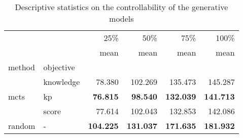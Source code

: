 \begin{table}[!h]
\centering
\caption{Descriptive statistics on the controllability of the generative models}
\label{tab:pcg_controllbility_small}
\begin{tabular}{llrrrr}
\toprule
{} & {} & {25\%} & {50\%} & {75\%} & {100\%} \\
{} & {} & {mean} & {mean} & {mean} & {mean} \\
{method} & {objective} & {} & {} & {} & {} \\
\midrule
\multirow[c]{3}{*}{mcts} & knowledge & 78.380 & 102.269 & 135.473 & 145.287 \\
 & kp & \textbf{76.815} & \textbf{98.540} & \textbf{132.039} & \textbf{141.713} \\
 & score & 77.614 & 102.043 & 132.853 & 142.086 \\
random & - & \textbf{104.225} & \textbf{131.037} & \textbf{171.635} & \textbf{181.932} \\
\bottomrule
\end{tabular}
\end{table}